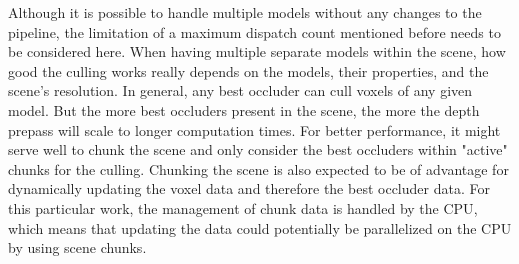 \noindent
Although it is possible to handle multiple models without any changes to the pipeline, the limitation of a maximum 
dispatch count mentioned before needs to be considered here. When having multiple separate models within the scene, 
how good the culling works really depends on the models, their properties, and the scene's resolution. In general, 
any best occluder can cull voxels of any given model. But the more best occluders present in the scene, the more 
the depth prepass will scale to longer computation times. For better performance, it might serve well to chunk the 
scene and only consider the best occluders within "active" chunks for the culling. Chunking the scene is also 
expected to be of advantage for dynamically updating the voxel data and therefore the best occluder data. For this 
particular work, the management of chunk data is handled by the \ac{CPU}, which means that updating the data could 
potentially be parallelized on the \ac{CPU} by using scene chunks. \\
